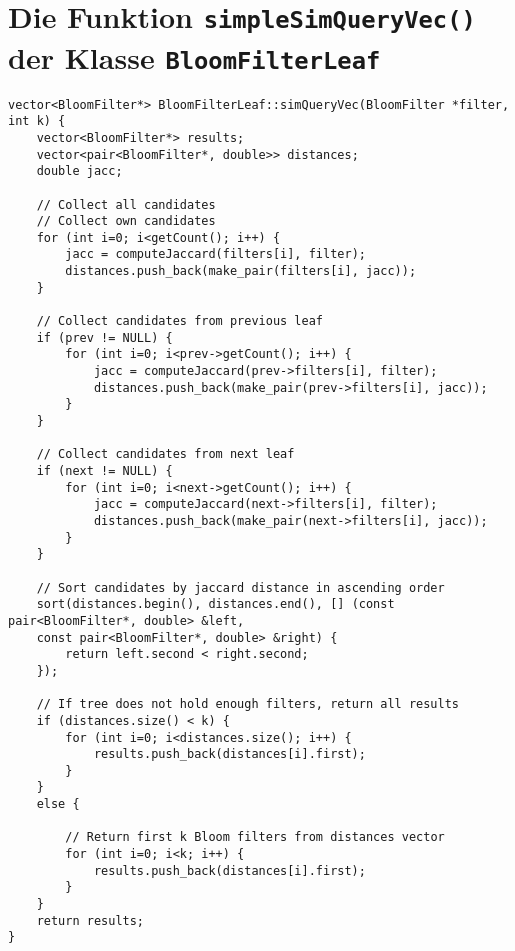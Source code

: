 \section{Die Funktion \texttt{simpleSimQueryVec()} der Klasse \texttt{BloomFilterLeaf}}\label{sec:simQueryVec()}
\small{
\begin{verbatim}
vector<BloomFilter*> BloomFilterLeaf::simQueryVec(BloomFilter *filter, int k) {
    vector<BloomFilter*> results;
    vector<pair<BloomFilter*, double>> distances;
    double jacc;
    
    // Collect all candidates
    // Collect own candidates
    for (int i=0; i<getCount(); i++) {
        jacc = computeJaccard(filters[i], filter);
        distances.push_back(make_pair(filters[i], jacc));
    }
    
    // Collect candidates from previous leaf
    if (prev != NULL) {
        for (int i=0; i<prev->getCount(); i++) {
            jacc = computeJaccard(prev->filters[i], filter);
            distances.push_back(make_pair(prev->filters[i], jacc));
        }
    }
    
    // Collect candidates from next leaf
    if (next != NULL) {
        for (int i=0; i<next->getCount(); i++) {
            jacc = computeJaccard(next->filters[i], filter);
            distances.push_back(make_pair(next->filters[i], jacc));
        }
    }
    
    // Sort candidates by jaccard distance in ascending order
    sort(distances.begin(), distances.end(), [] (const pair<BloomFilter*, double> &left, 
    const pair<BloomFilter*, double> &right) {
        return left.second < right.second;
    });
    
    // If tree does not hold enough filters, return all results
    if (distances.size() < k) {
        for (int i=0; i<distances.size(); i++) {
            results.push_back(distances[i].first);
        }
    }
    else {
        
        // Return first k Bloom filters from distances vector
        for (int i=0; i<k; i++) {
            results.push_back(distances[i].first);
        }
    }
    return results;
}
\end{verbatim}
}